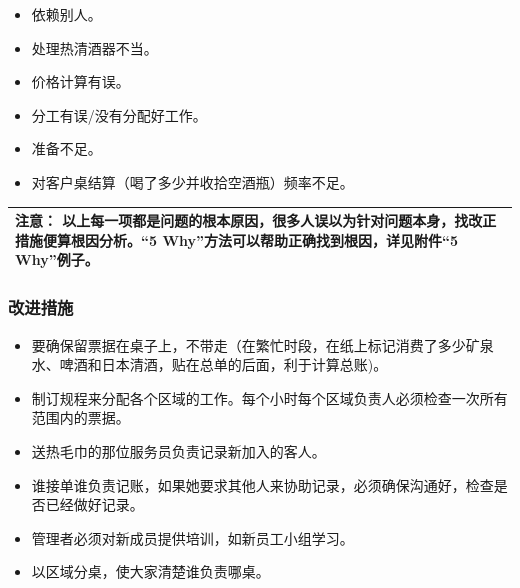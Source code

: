 \begin{itemize}
\tightlist
\item
  依赖别人。
\end{itemize}

\begin{itemize}
\tightlist
\item
  处理热清酒器不当。
\end{itemize}

\begin{itemize}
\tightlist
\item
  价格计算有误。
\end{itemize}

\begin{itemize}
\tightlist
\item
  分工有误/没有分配好工作。
\end{itemize}

\begin{itemize}
\tightlist
\item
  准备不足。
\end{itemize}

\begin{itemize}
\tightlist
\item
  对客户桌结算（喝了多少并收拾空酒瓶）频率不足。
\end{itemize}

\begin{longtable}[]{@{}l@{}}
\toprule
\endhead
注意：
以上每一项都是问题的根本原因，很多人误以为针对问题本身，找改正措施便算根因分析。``5
Why''方法可以帮助正确找到根因，详见附件``5 Why''例子。\tabularnewline
\bottomrule
\end{longtable}

\hypertarget{ux6539ux8fdbux63aaux65bd}{%
\subsubsection{改进措施}\label{ux6539ux8fdbux63aaux65bd}}

\begin{itemize}
\tightlist
\item
  要确保留票据在桌子上，不带走（在繁忙时段，在纸上标记消费了多少矿泉水、啤酒和日本清酒，贴在总单的后面，利于计算总账)。
\item
  制订规程来分配各个区域的工作。每个小时每个区域负责人必须检查一次所有范围内的票据。
\item
  送热毛巾的那位服务员负责记录新加入的客人。
\item
  谁接单谁负责记账，如果她要求其他人来协助记录，必须确保沟通好，检查是否已经做好记录。
\item
  管理者必须对新成员提供培训，如新员工小组学习。
\item
  以区域分桌，使大家清楚谁负责哪桌。
\end{itemize}

